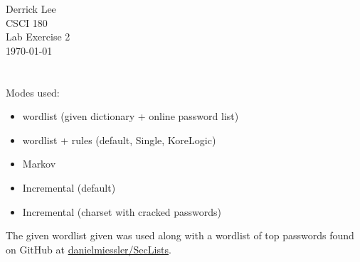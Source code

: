 \documentclass[12pt]{exam}
\begin{document}
\noindent
Derrick Lee\\
CSCI 180\\
Lab Exercise 2\\
\today\\

\section{}

Modes used:
\begin{itemize}[noitemsep]
    \item wordlist (given dictionary + online password list)
    \item wordlist + rules (default, Single, KoreLogic)
    \item Markov
    \item Incremental (default)
    \item Incremental (charset with cracked passwords)
\end{itemize}

The given wordlist given was used along with a wordlist of top passwords found
on GitHub at \href{https://github.com/danielmiessler/SecLists/tree/master/Passwords/Common-Credentials}{danielmiessler/SecLists}.

\vspace*{.21in}
\end{document}
